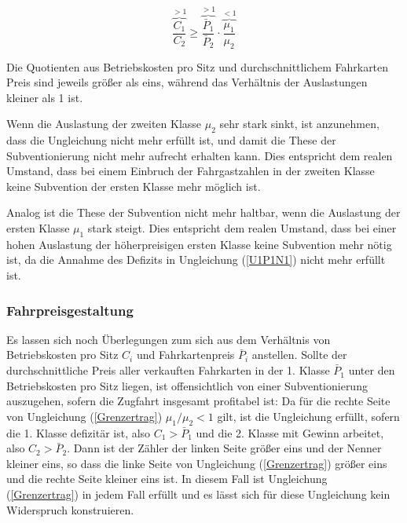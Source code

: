 \documentclass[a4paper,12pt]{article}
\begin{document}
\begin{equation}
\overbrace{\frac{C_1}{C_2}}^{>1} \geq  \overbrace{\frac{\bar P_1}{\bar P_2}}^{>1} \cdot \overbrace{\frac{\mu_1}{\mu_2}}^{<1}
\label{quali}
\end{equation}

Die Quotienten aus Betriebskosten pro Sitz und durchschnittlichem Fahrkarten Preis sind jeweils größer als eins, während das Verhältnis der Auslastungen kleiner als 1 ist. 

Wenn die Auslastung der zweiten Klasse $\mu_2$ sehr stark sinkt, ist anzunehmen, dass die Ungleichung nicht mehr erfüllt ist, und damit die These der Subventionierung nicht mehr aufrecht erhalten kann. Dies entspricht dem realen Umstand, dass bei einem Einbruch der Fahrgastzahlen in der zweiten Klasse keine Subvention der ersten Klasse mehr möglich ist.

Analog ist die These der Subvention nicht mehr haltbar, wenn die Auslastung der ersten Klasse $\mu_1$ stark steigt. Dies entspricht dem realen Umstand, dass bei einer hohen Auslastung der höherpreisigen ersten Klasse keine Subvention mehr nötig ist, da die Annahme des Defizits in Ungleichung (\ref{U1P1N1}) nicht mehr erfüllt ist.

\subsubsection{Fahrpreisgestaltung}

Es lassen sich noch Überlegungen zum sich aus dem Verhältnis von Betriebskosten pro Sitz $C_i$ und Fahrkartenpreis $\bar P_i$ anstellen. Sollte der durchschnittliche Preis aller verkauften Fahrkarten in der 1. Klasse $\bar P_1$ unter den Betriebskosten pro Sitz liegen, ist offensichtlich von einer Subventionierung auszugehen, sofern die Zugfahrt insgesamt profitabel ist: Da für die rechte Seite von Ungleichung (\ref{Grenzertrag}) $\mu_1/\mu_2 < 1$ gilt, ist die Ungleichung erfüllt, sofern die 1. Klasse defizitär ist, also $C_1 > \bar P_1$ und die 2. Klasse mit Gewinn arbeitet, also $C_2 > \bar P_2$. Dann ist der Zähler der linken Seite größer eins und der Nenner kleiner eins, so dass die linke Seite von Ungleichung (\ref{Grenzertrag}) größer eins und die rechte Seite kleiner eins ist.
 In diesem Fall ist Ungleichung (\ref{Grenzertrag}) in jedem Fall erfüllt und es lässt sich für diese Ungleichung kein Widerspruch konstruieren.

\end{document}
